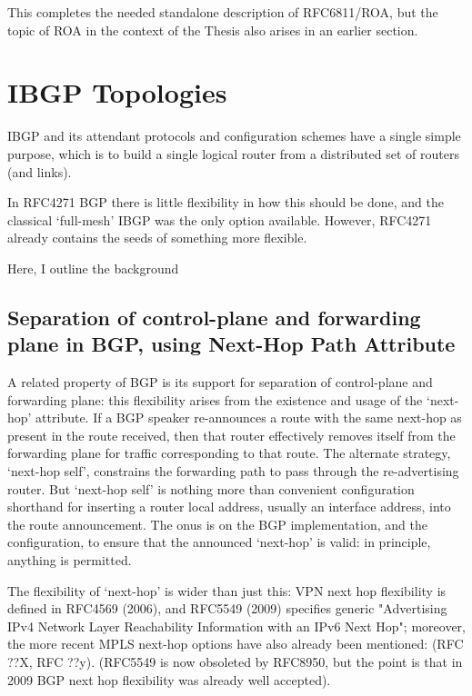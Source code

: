 This completes the needed standalone description of RFC6811/ROA, but the topic of ROA in the context of the Thesis also arises in an earlier section.

\section{IBGP Topologies}

IBGP and its attendant protocols and configuration schemes have a single simple purpose, which is to build a single logical router from a distributed set of routers (and links).

In RFC4271 BGP there is little flexibility in how this should be done, and the classical `full-mesh' IBGP was the only option available.  However, RFC4271 already contains the seeds of something more flexible.

Here, I outline the background
\medskip

\subsection{Separation of control-plane and forwarding plane in BGP, using Next-Hop Path Attribute}

A related property of BGP is its support for separation of control-plane and forwarding plane: this flexibility arises from the existence and usage of the `next-hop' attribute.  If a BGP speaker re-announces a route with the same next-hop as present in the route received, then that router effectively removes itself from the forwarding plane for traffic corresponding to that route.  The alternate strategy, `next-hop self', constrains the forwarding path to pass through the re-advertising router.  But  `next-hop self' is nothing more than convenient configuration shorthand for inserting a router local address, usually an interface address, into the route announcement.  The onus is on the BGP implementation, and the configuration, to ensure that the announced `next-hop' is valid: in principle, anything is permitted.

The flexibility of `next-hop' is wider than just this: VPN next hop flexibility is defined in RFC4569\cite{rfc4659} (2006), and RFC5549 (2009) \cite{rfc5549} specifies generic "Advertising IPv4 Network Layer Reachability Information with an IPv6 Next Hop"; moreover, the more recent  MPLS next-hop options have also already been mentioned: (RFC ??X, RFC ??y). (RFC5549 is now obsoleted by RFC8950, but the point is that in 2009 BGP next hop flexibility was already well accepted).

